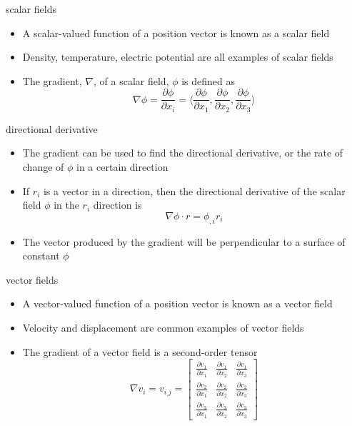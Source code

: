 \begin{frame}{scalar fields}
\protect\hypertarget{scalar-fields}{}
\begin{itemize}
\tightlist
\item
  A scalar-valued function of a position vector is known as a scalar
  field
\item
  Density, temperature, electric potential are all examples of scalar
  fields
\item
  The gradient, \(\nabla\), of a scalar field, \(\phi\) is defined as
  \[\nabla \phi = \frac{\partial \phi}{\partial x_i} = \langle \frac{\partial \phi}{\partial x_1}, \frac{\partial \phi}{\partial x_2}, \frac{\partial \phi}{\partial x_3} \rangle\]
\end{itemize}
\end{frame}

\begin{frame}{directional derivative}
\protect\hypertarget{directional-derivative}{}
\begin{itemize}
\tightlist
\item
  The gradient can be used to find the directional derivative, or the
  rate of change of \(\phi\) in a certain direction
\item
  If \(r_i\) is a vector in a direction, then the directional derivative
  of the scalar field \(\phi\) in the \(r_i\) direction is
  \[\nabla \phi \cdot r = \phi_{,i} r_i\]
\item
  The vector produced by the gradient will be perpendicular to a surface
  of constant \(\phi\)
\end{itemize}
\end{frame}

\begin{frame}{vector fields}
\protect\hypertarget{vector-fields}{}
\begin{itemize}
\tightlist
\item
  A vector-valued function of a position vector is known as a vector
  field
\item
  Velocity and displacement are common examples of vector fields
\item
  The gradient of a vector field is a second-order tensor
  \[\nabla v_i = v_{i_,j} = \begin{bmatrix}
    \frac{\partial v_1}{\partial x_1} & \frac{\partial v_1}{\partial x_2} & \frac{\partial v_1}{\partial x_3}\\
    \frac{\partial v_2}{\partial x_1} & \frac{\partial v_2}{\partial x_2} & \frac{\partial v_2}{\partial x_3}\\
    \frac{\partial v_3}{\partial x_1} & \frac{\partial v_3}{\partial x_2} & \frac{\partial v_3}{\partial x_3}
  \end{bmatrix}\]
\end{itemize}
\end{frame}

